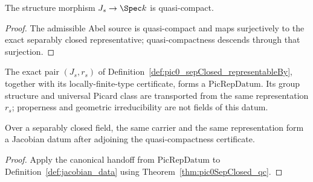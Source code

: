 \begin{theorem}
  \label{thm:pic0SepClosed_qc}
  \leanok
  The structure morphism \(J_s\to\Spec k\) is quasi-compact.
\end{theorem}
\begin{proof}
  \leanok
  The admissible Abel source is quasi-compact and maps surjectively to the exact
  separably closed representative; quasi-compactness descends through that surjection.
\end{proof}

\begin{definition}
  \label{def:pic0SepClosedDescentInput}
  \leanok
  The exact pair \((J_s,r_s)\) of
  Definition~\ref{def:pic0_sepClosed_representableBy}, together with its locally-finite-type
  certificate, forms a \(\mathrm{PicRepDatum}\).  Its group structure and universal Picard
  class are transported from the same representation \(r_s\); properness and geometric
  irreducibility are not fields of this datum.
\end{definition}

\begin{theorem}
  \label{thm:pic0SepClosedDescentInput_exists}
  \leanok
  Over a separably closed field, the same carrier and the same representation form a Jacobian
  datum after adjoining the quasi-compactness certificate.
\end{theorem}
\begin{proof}
  \leanok
  Apply the canonical handoff from \(\mathrm{PicRepDatum}\) to
  Definition~\ref{def:jacobian_data} using Theorem~\ref{thm:pic0SepClosed_qc}.
\end{proof}

